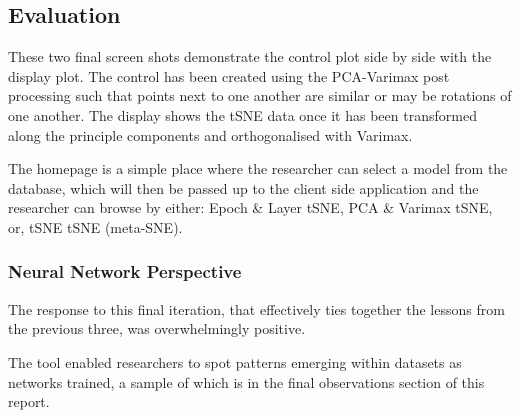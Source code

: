 \documentclass[a4paper,11pt,titlepage]{article}
\begin{document}
\subsection{Evaluation}
These two final screen shots demonstrate the control plot side by side with the display plot. The control has been created using the PCA-Varimax post processing such that points next to one another are similar or may be rotations of one another. The display shows the tSNE data once it has been transformed along the principle components and orthogonalised with Varimax. 
\par 
The homepage is a simple place where the researcher can select a model from the database, which will then be passed up to the client side application and the researcher can browse by either: Epoch \& Layer tSNE, PCA \& Varimax tSNE, or, tSNE tSNE (meta-SNE).

	\begin{figure}[H]
    			\centering	
    			 \qquad
    			\caption{}%
    			\label{fig:pca_varimax}
	\end{figure}

	\subsubsection{Neural Network Perspective}
	The response to this final iteration, that effectively ties together the lessons from the previous three, was overwhelmingly positive.
	\par 
	The tool enabled researchers to spot patterns emerging within datasets as networks trained, a sample of which is in the final observations section of this report.
	
\end{document}
